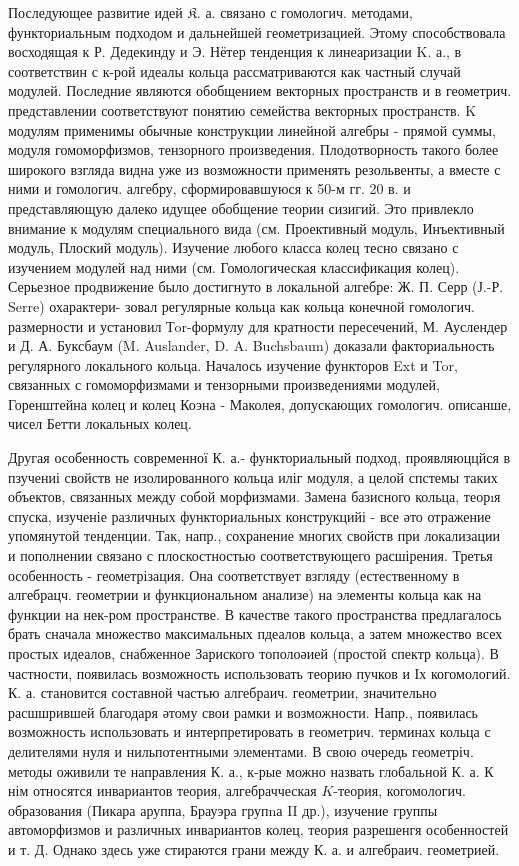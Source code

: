 \documentclass[10pt]{article}
\begin{document}
Последующее развитие идей $\mathfrak{K}$. а. связано с гомологич. методами, функториальным подходом и дальнейшей геометризацией. Этому способствовала восходящая к Р. Дедекинду и Э. Нётер тенденция к линеаризации K. а., в соответствин с к-рой идеалы кольца рассматриваются как частный случай модулей. Последние являются обобщением векторных пространств и в геометрич. представлении соответствуют понятию семейства векторных пространств. K модулям применимы обычные конструкции линейной алгебры - прямой суммы, модуля гомоморфизмов, тензорного произведения. Плодотворность такого более широкого взгляда видна уже из возможности применять резольвенты, а вместе с ними и гомологич. алгебру, сформировавшуюся к 50-м гг. 20 в. и представляющую далеко идущее обобщение теории сизигий. Это привлекло внимание к модулям специального вида (см. Проективный модуль, Инъективный модуль, Плоский модуль). Изучение любого класса колец тесно связано с изучением модулей над ними (см. Гомологическая классификация колец). Серьезное продвижение было достигнуто в локальной алгебре: Ж. П. Серр (Ј.-Р. Serre) охарактери- зовал регулярные кольца как кольца конечной гомологич. размерности и установил Тor-формулу для кратности пересечений, М. Ауслендер и Д. А. Буксбаум (M. Auslander, D. A. Buchsbaum) доказали факториальность регулярного локального кольца. Началось изучение функторов Ext и Tor, связанных с гомоморфизмами и тензорными произведениями модулей, Горенштейна колец и колец Коэна - Маколея, допускающих гомологич. описанше, чисел Бетти локальных колец.



Другая особенность современної К. а.- функториальный подход, проявляюццйся в пзучениі свойств не изолированного кольца иліг модуля, а целой спстемы таких объектов, связанных между собой морфизмами. Замена базисного кольца, теорıя спуска, изученіе различных функториальных конструкцийі - все әто отражение упомянутой тенденции. Так, напр., сохранение многих свойств при локализации и пополнении связано с плоскостностью соответствующего расшірения. Третья особенность - геометрізация. Она соответствует взгляду (естественному в алгебрацч. геометрии и функциональном анализе) на элементы кольца как на функции на нек-ром пространстве. В качестве такого пространства предлагалось брать сначала множество максимальных пдеалов кольца, а затем множество всех простых идеалов, снабженное Зариского тополоәией (простой спектр кольца). В частности, появилась возможность использовать теорию пучков и Іх когомологий. К. а. становится составной частью алгебраич. геометрии, значительно расшшрившей благодаря әтому свои рамки и возможности. Напр., появилась возможность использовать и интерпретировать в геометрич. терминах кольца с делителями нуля и нильпотентными элементами. В свою очередь геометріч. методы оживили те направления К. а., к-рые можно назвать глобальной К. а. К нім относятся инвариантов теория, алгебрачческая $K$-теория, когомологич. образования (Пикара аруппа, Брауэра групnа II др.), изучение группы автоморфизмов и различных инвариантов колец, теория разрешенгя особенностей и т. Д. Однако здесь уже стираются грани между К. а. и алгебраич. геометрией.
\end{document}
